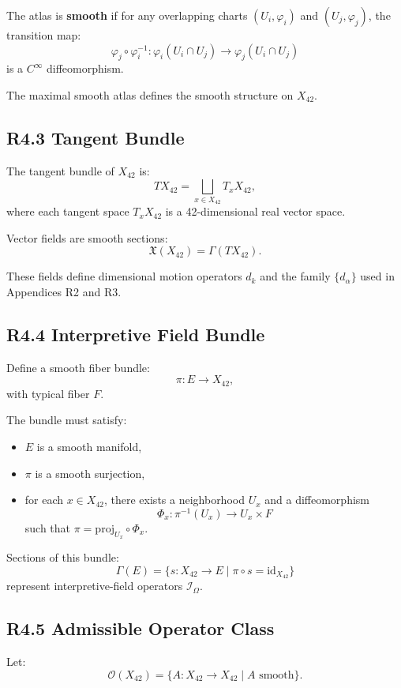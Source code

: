 The atlas is \textbf{smooth} if for any overlapping charts
$(U_i, \varphi_i)$ and $(U_j, \varphi_j)$, the transition map:
\[
\varphi_j \circ \varphi_i^{-1} :
\varphi_i(U_i \cap U_j) \to \varphi_j(U_i \cap U_j)
\]
is a $C^\infty$ diffeomorphism.

The maximal smooth atlas defines the smooth structure on $X_{42}$.

\subsection*{R4.3 Tangent Bundle}

The tangent bundle of $X_{42}$ is:
\[
TX_{42} = \bigsqcup_{x \in X_{42}} T_x X_{42},
\]
where each tangent space $T_x X_{42}$ is a 42-dimensional real vector
space.

Vector fields are smooth sections:
\[
\mathfrak{X}(X_{42}) = \Gamma(TX_{42}).
\]

These fields define dimensional motion operators $d_k$ and the family
$\{d_{\alpha}\}$ used in Appendices R2 and R3.

\subsection*{R4.4 Interpretive Field Bundle}

Define a smooth fiber bundle:
\[
\pi : E \to X_{42},
\]
with typical fiber $F$.

The bundle must satisfy:

\begin{itemize}
    \item $E$ is a smooth manifold,
    \item $\pi$ is a smooth surjection,
    \item for each $x \in X_{42}$, there exists a neighborhood $U_x$
    and a diffeomorphism
    \[
    \Phi_x : \pi^{-1}(U_x) \to U_x \times F
    \]
    such that $\pi = \mathrm{proj}_{U_x} \circ \Phi_x$.
\end{itemize}

Sections of this bundle:
\[
\Gamma(E) = \{ s : X_{42} \to E \mid \pi \circ s = \mathrm{id}_{X_{42}} \}
\]
represent interpretive-field operators $\mathcal{I}_{\Omega}$.

\subsection*{R4.5 Admissible Operator Class}

Let:
\[
\mathcal{O}(X_{42}) = \{ A : X_{42} \to X_{42} \mid A \text{ smooth} \}.
\]

